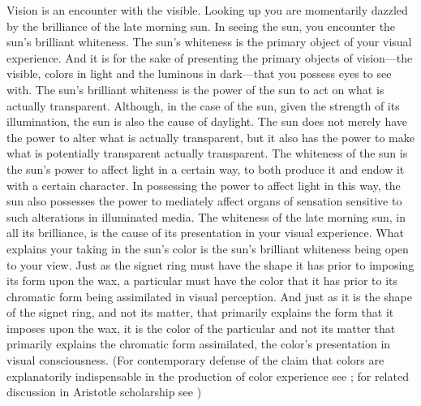 Vision is an encounter with the visible. Looking up you are momentarily dazzled by the brilliance of the late morning sun. In seeing the sun, you encounter the sun's brilliant whiteness. The sun's whiteness is the primary object of your visual experience. And it is for the sake of presenting the primary objects of vision---the visible, colors in light and the luminous in dark---that you possess eyes to see with. The sun's brilliant whiteness is the power of the sun to act on what is actually transparent. Although, in the case of the sun, given the strength of its illumination, the sun is also the cause of daylight. The sun does not merely have the power to alter what is actually transparent, but it also has the power to make what is potentially transparent actually transparent. The whiteness of the sun is the sun's power to affect light in a certain way, to both produce it and endow it with a certain character. In possessing the power to affect light in this way, the sun also possesses the power to mediately affect organs of sensation sensitive to such alterations in illuminated media. The whiteness of the late morning sun, in all its brilliance, is the cause of its presentation in your visual experience. What explains your taking in the sun's color is the sun's brilliant whiteness being open to your view. Just as the signet ring must have the shape it has prior to imposing its form upon the wax, a particular must have the color that it has prior to its chromatic form being assimilated in visual perception. And just as it is the shape of the signet ring, and not its matter, that primarily explains the form that it imposes upon the wax, it is the color of the particular and not its matter that primarily explains the chromatic form assimilated, the color's presentation in visual consciousness. (For contemporary defense of the claim that colors are explanatorily indispensable in the production of color experience see \citealt{Campbell:1997dq,Broackes:1997pa,Yablo:1995fk}; for related discussion in Aristotle scholarship see \citealt{Broadie:1993fk,Broackes:1999uq})

